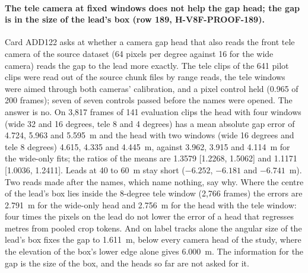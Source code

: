 \paragraph{The tele camera at fixed windows does not help the gap head; the gap is in the size of the lead's box (row 189, H-V8F-PROOF-189).} Card ADD122 asks at  whether a camera gap head that also reads the front tele camera of the source dataset (64 pixels per degree against 16 for the wide camera) reads the gap to the lead more exactly. The tele clips of the 641 pilot clips were read out of the source chunk files by range reads, the tele windows were aimed through both cameras' calibration, and a pixel control held (0.965 of 200 frames); seven of seven controls passed before the names were opened. The answer is no. On 3,817 frames of 141 evaluation clips the head with four windows (wide 32 and 16 degrees, tele 8 and 4 degrees) has a mean absolute gap error of 4.724, 5.963 and 5.595~m and the head with two windows (wide 16 degrees and tele 8 degrees) 4.615, 4.335 and 4.445~m, against 3.962, 3.915 and 4.114~m for the wide-only fits; the ratios of the means are 1.3579 [1.2268, 1.5062] and 1.1171 [1.0036, 1.2411]. Leads at 40 to 60~m stay short ($-6.252$, $-6.181$ and $-6.741$~m). Two reads made after the names, which name nothing, say why. Where the centre of the lead's box lies inside the 8-degree tele window (2,766 frames) the errors are 2.791~m for the wide-only head and 2.756~m for the head with the tele window: four times the pixels on the lead do not lower the error of a head that regresses metres from pooled crop tokens. And on label tracks alone the angular size of the lead's box fixes the gap to 1.611~m, below every camera head of the study, where the elevation of the box's lower edge alone gives 6.000~m. The information for the gap is the size of the box, and the heads so far are not asked for it.

